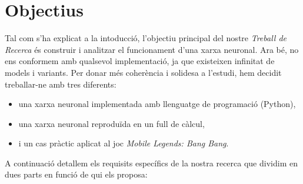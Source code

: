 \chapter{Objectius}
\label{c:objectius}

Tal com s’ha explicat a la intoducció, l’objectiu principal del nostre \textit{Treball de Recerca} és construir i analitzar el funcionament d’una xarxa neuronal. Ara bé, no ens conformem amb qualsevol implementació, ja que existeixen infinitat de models i variants. Per donar més coherència i solidesa a l’estudi, hem decidit treballar-ne amb tres diferents:

\begin{itemize}
    \item una xarxa neuronal implementada amb llenguatge de programació (Python),
    \item una xarxa neuronal reproduïda en un full de càlcul,
    \item i un cas pràctic aplicat al joc \textit{Mobile Legends: Bang Bang}.
\end{itemize}


A continuació detallem els requisits específics de la nostra recerca que dividim en dues parts en funció de qui els proposa:

